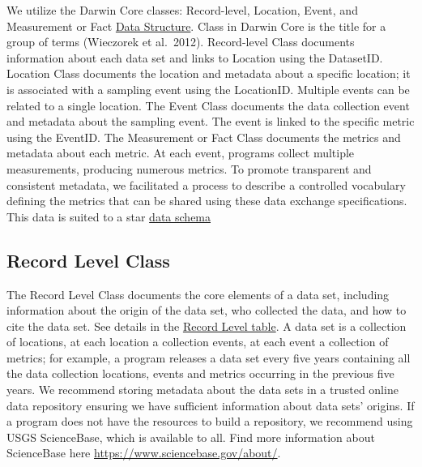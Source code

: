 \documentclass[
]{article}
\begin{document}
We utilize the Darwin Core classes: Record-level, Location, Event, and
Measurement or Fact
\href{Figures/StructureOfDarwinCoreForHabitatMetrics.png}{Data
Structure}. Class in Darwin Core is the title for a group of terms
(Wieczorek et al.~2012). Record-level Class documents information about
each data set and links to Location using the DatasetID. Location Class
documents the location and metadata about a specific location; it is
associated with a sampling event using the LocationID. Multiple events
can be related to a single location. The Event Class documents the data
collection event and metadata about the sampling event. The event is
linked to the specific metric using the EventID. The Measurement or Fact
Class documents the metrics and metadata about each metric. At each
event, programs collect multiple measurements, producing numerous
metrics. To promote transparent and consistent metadata, we facilitated
a process to describe a controlled vocabulary defining the metrics that
can be shared using these data exchange specifications. This data is
suited to a star \href{Figures/HabiatDataSharingSchema.png}{data schema}

\hypertarget{record-level-class}{%
\subsection{Record Level Class}\label{record-level-class}}

The Record Level Class documents the core elements of a data set,
including information about the origin of the data set, who collected
the data, and how to cite the data set. See details in the
\href{Tables/RecordLevel_table.csv}{Record Level table}. A data set is a
collection of locations, at each location a collection events, at each
event a collection of metrics; for example, a program releases a data
set every five years containing all the data collection locations,
events and metrics occurring in the previous five years. We recommend
storing metadata about the data sets in a trusted online data repository
ensuring we have sufficient information about data sets' origins. If a
program does not have the resources to build a repository, we recommend
using USGS ScienceBase, which is available to all. Find more information
about ScienceBase here \url{https://www.sciencebase.gov/about/}.
\end{document}
